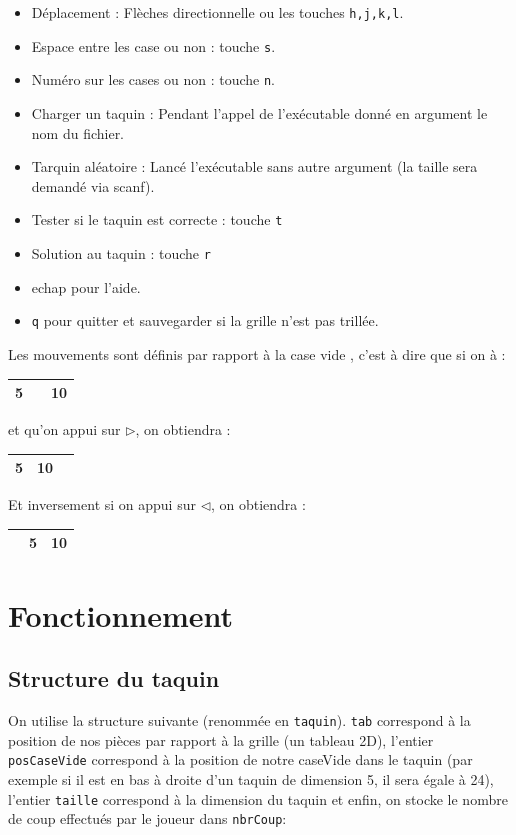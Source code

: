 \documentclass[a4paper]{article}
\begin{document}
\begin{itemize}
\item Déplacement : Flèches directionnelle ou les touches \texttt{h,j,k,l}.
\item Espace entre les case ou non : touche \texttt{s}.
\item Numéro sur les cases ou non : touche \texttt{n}.
\item Charger un taquin : Pendant l'appel de l'exécutable donné en argument le nom du fichier.
\item Tarquin aléatoire : Lancé l'exécutable sans autre argument (la taille sera demandé via scanf).
\item Tester si le taquin est correcte : touche \texttt{t}
\item Solution au taquin : touche \texttt{r}
\item echap pour l'aide.
\item \texttt{q} pour quitter et sauvegarder si la grille n'est pas trillée.
\end{itemize}


Les mouvements sont définis par rapport à la case vide , c'est à dire que si on à :
\begin{tabular}{|c|c|c|}
  \hline
  5 &  & 10 \\
  \hline
\end{tabular}
et qu'on appui sur $\triangleright$, on obtiendra :
\begin{tabular}{|c|c|c|}
  \hline
  5 & 10 &   \\
  \hline
\end{tabular}
Et inversement si on appui sur $\triangleleft$, on obtiendra :
\begin{tabular}{|c|c|c|}
  \hline
  & 5 & 10  \\
  \hline
\end{tabular}


\section{Fonctionnement}
\label{sec:fonctionnement}

\subsection{Structure du taquin}
\label{subsec:structTaquin}

On utilise la structure suivante (renommée en \texttt{taquin}). \texttt{tab}
correspond à la position de nos pièces par rapport à la grille (un tableau 2D),
l'entier \texttt{posCaseVide} correspond à la position de notre caseVide dans le
taquin (par exemple si il est en bas à droite d'un taquin de dimension 5, il
sera égale à 24), l'entier \texttt{taille} correspond à la dimension du
taquin et enfin, on stocke le nombre de coup effectués par le joueur dans \texttt{nbrCoup}:
\end{document}

